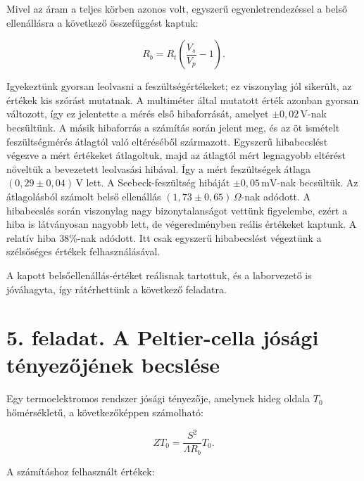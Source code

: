 \documentclass[11pt]{article}
\begin{document}
Mivel az áram a teljes körben azonos volt, egyszerű egyenletrendezéssel a belső ellenállásra a következő összefüggést kaptuk:

$$
R_b = R_t\left(\frac{V_s}{V_p} - 1\right).
$$

Igyekeztünk gyorsan leolvasni a feszültségértékeket; ez viszonylag jól sikerült, az értékek kis szórást mutatnak. A multiméter által mutatott érték azonban gyorsan változott, így ez jelentette a mérés első hibaforrását, amelyet $\pm 0,02 \,\mathrm{V}$-nak becsültünk. A másik hibaforrás a számítás során jelent meg, és az öt ismételt feszültségmérés átlagtól való eltéréséből származott. Egyszerű hibabecslést végezve a mért értékeket átlagoltuk, majd az átlagtól mért legnagyobb eltérést növeltük a bevezetett leolvasási hibával. Így a mért feszültségek átlaga $(0,29 \pm 0,04) \,\mathrm{V}$ lett. A Seebeck-feszültség hibáját $\pm 0,05 \,\mathrm{mV}$-nak becsültük. Az átlagolásból számolt belső ellenállás $(1,73 \pm 0,65) \,\Omega$-nak adódott. A hibabecslés során viszonylag nagy bizonytalanságot vettünk figyelembe, ezért a hiba is látványosan nagyobb lett, de végeredményben reális értékeket kaptunk. A relatív hiba $38\%$-nak adódott. Itt csak egyszerű hibabecslést végeztünk a szélsőséges értékek felhasználásával.

A kapott belsőellenállás-értéket reálisnak tartottuk, és a laborvezető is jóváhagyta, így rátérhettünk a következő feladatra.

\section*{5. feladat. A Peltier-cella jósági tényezőjének becslése}

Egy termoelektromos rendszer jósági tényezője, amelynek hideg oldala $T_0$ hőmérsékletű, a következőképpen számolható:

$$
ZT_0 = \frac{S^2}{\Lambda R_b}T_0.
$$

A számításhoz felhasznált értékek:
\begin{center}
\end{center}
\end{document}
